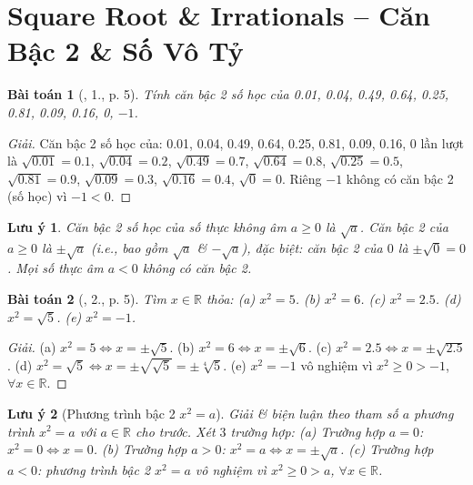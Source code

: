 \documentclass{article}
\newtheorem{baitoan}{Bài toán}
\newtheorem{luuy}{Lưu ý}
\begin{document}
\tableofcontents
\newpage


\section{Square Root \& Irrationals -- Căn Bậc 2 \& Số Vô Tỷ}

\begin{baitoan}[\cite{SBT_Toan_9_tap_1}, 1., p. 5]
	Tính căn bậc 2 số học của \emph{0.01, 0.04, 0.49, 0.64, 0.25, 0.81, 0.09, 0.16, 0, $-1$.}
\end{baitoan}

\begin{proof}[Giải]
	Căn bậc 2 số học của: 0.01, 0.04, 0.49, 0.64, 0.25, 0.81, 0.09, 0.16, 0 lần lượt là $\sqrt{0.01} = 0.1$, $\sqrt{0.04} = 0.2$, $\sqrt{0.49} = 0.7$, $\sqrt{0.64} = 0.8$, $\sqrt{0.25} = 0.5$, $\sqrt{0.81} = 0.9$, $\sqrt{0.09} = 0.3$, $\sqrt{0.16} = 0.4$, $\sqrt{0} = 0$. Riêng $-1$ không có căn bậc 2 (số học) vì $-1 < 0$.
\end{proof}

\begin{luuy}
	Căn bậc 2 số học của số thực không âm $a\ge0$ là $\sqrt{a}$. Căn bậc 2 của $a\ge0$ là $\pm\sqrt{a}$ (i.e., bao gồm $\sqrt{a}$ \& $-\sqrt{a}$), đặc biệt: căn bậc 2 của $0$ là $\pm\sqrt{0} = 0$. Mọi số thực âm $a < 0$ không có căn bậc 2. 
\end{luuy}

\begin{baitoan}[\cite{SBT_Toan_9_tap_1}, 2., p. 5]
	Tìm $x\in\mathbb{R}$ thỏa: (a) $x^2 = 5$. (b) $x^2 = 6$. (c) $x^2 = 2.5$. (d) $x^2 = \sqrt{5}$. (e) $x^2 = -1$.
\end{baitoan}

\begin{proof}[Giải]
	(a) $x^2 = 5\Leftrightarrow x = \pm\sqrt{5}$. (b) $x^2 = 6\Leftrightarrow x = \pm\sqrt{6}$. (c) $x^2 = 2.5\Leftrightarrow x = \pm\sqrt{2.5}$. (d) $x^2 = \sqrt{5}\Leftrightarrow x = \pm\sqrt{\sqrt{5}} = \pm\sqrt[4]{5}$. (e) $x^2 = -1$ vô nghiệm vì $x^2\ge0 > -1$, $\forall x\in\mathbb{R}$.
\end{proof}

\begin{luuy}[Phương trình bậc 2 $x^2 = a$]
	Giải \& biện luận theo tham số $a$ phương trình $x^2 = a$ với $a\in\mathbb{R}$ cho trước. Xét $3$ trường hợp: (a) Trường hợp $a = 0$: $x^2 = 0\Leftrightarrow x = 0$. (b) Trường hợp $a > 0$: $x^2 = a\Leftrightarrow x = \pm\sqrt{a}$. (c) Trường hợp $a < 0$: phương trình bậc 2 $x^2 = a$ vô nghiệm vì $x^2\ge0 > a$, $\forall x\in\mathbb{R}$.
\end{luuy}
\end{document}
